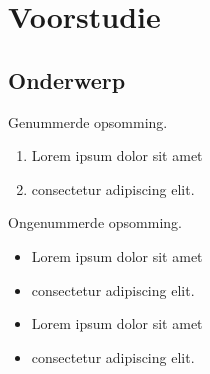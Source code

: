 
\section{Voorstudie} %
\label{sec:voorstudie}

\subsection{Onderwerp} %
\label{sub:onderwerp}

\lipsum[1]

Genummerde opsomming.

\begin{enumerate}
  \item Lorem ipsum dolor sit amet
  \item consectetur adipiscing elit.
\end{enumerate}

Ongenummerde opsomming.

\begin{itemize}
  \item Lorem ipsum dolor sit amet
  \item consectetur adipiscing elit.
  \item Lorem ipsum dolor sit amet
  \item consectetur adipiscing elit.
\end{itemize}
